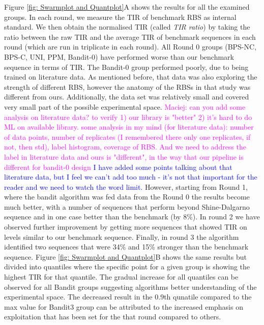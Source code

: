 \documentclass{article}
\newcommand{\mengyan}[1]{\textcolor{magenta}{#1}}
\newcommand{\maciej}[1]{\textcolor{blue}{#1}}
\begin{document}
Figure \ref{fig: Swarmplot and Quantplot}A shows the results for all the examined groups. 
In each round, we measure the TIR of benchmark RBS as internal standard. 
We then obtain the normalised TIR (called \textit{TIR ratio}) by taking the ratio between the raw TIR and the average TIR of benchmark sequences in each round (which are run in triplicate in each round).
All Round 0 groups (BPS-NC, BPS-C, UNI, PPM, Bandit-0) have performed worse than our benchmark sequence in terms of TIR. 
The Bandit-0 group performed poorly, due to being trained on literature data.
As mentioned before, that data was also exploring the strength of different RBS, however the anatomy of the RBSs in that study was different from ours.
Additionally, the data set was relatively small and covered very small part of the possible experimental space.
\mengyan{Maciej: can you add some analysis on literature data?
to verify 1) our library is "better" 2) it's hard to do ML on available library. some analysis in my mind (for literature data): number of data points, number of replicates (I remembered there only one replicates, if not, then std), label histogram, coverage of RBS.
And we need to address the label in literature data and ours is "different", in the way that our pipeline is different for bandit-0 design}
\maciej{I have added some points talking about that literature data, but I feel we can't add too much - it's not that important for the reader and we need to watch the word limit.}
However, starting from Round 1, where the bandit algorithm was fed data from the Round 0 the results become much better, with a number of sequences that perform beyond Shine-Dalgarno sequence and in one case better than the benchmark (by 8\%).
In round 2 we have observed further improvement by getting more sequences that showed TIR on levels similar to our benchmark sequence.
Finally, in round 3 the algorithm identified two sequences that were 34\% and 15\% stronger than the benchmark sequence.
Figure \ref{fig: Swarmplot and Quantplot}B shows the same results but divided into quantiles where the specific point for a given group is showing the highest TIR for that quantile.
The gradual increase for all quantiles can be observed for all Bandit groups suggesting algorithms better understanding of the experimental space.
The decreased result in the 0.9th qunatile compared to the max value for Bandit3 group can be attributed to the increased emphasis on exploitation that has been set for the that round compared to others.
\end{document}
